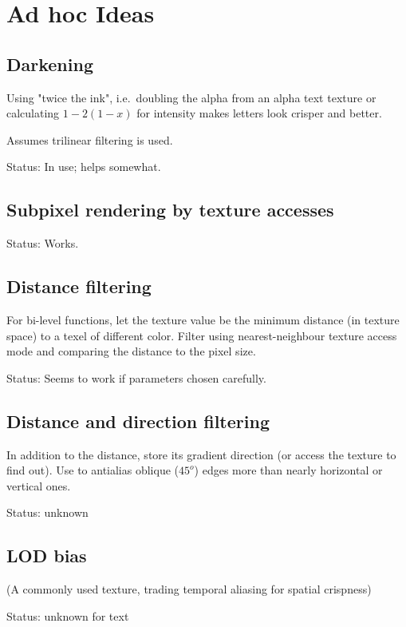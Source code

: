 \documentclass{article}
\begin{document}
\section{Ad hoc Ideas}


\subsection{Darkening}

Using "twice the ink", i.e.~doubling the alpha from an alpha text 
texture or calculating $1-2(1-x)$ for intensity makes
letters look crisper and better.

Assumes trilinear filtering is used.

Status: In use; helps somewhat.

\subsection{Subpixel rendering by texture accesses}

Status: Works.


\subsection{Distance filtering}

For bi-level functions, let the texture value be the minimum
distance (in texture space) to a texel of different color.
Filter using nearest-neighbour texture access mode and comparing
the distance to the pixel size.

Status: Seems to work if parameters chosen carefully.

\subsection{Distance and direction filtering}

In addition to the distance, store its gradient direction
(or access the texture to find out). Use to antialias
oblique ($45^o$) edges more than nearly horizontal or vertical ones.

Status: unknown

\subsection{LOD bias}

(A commonly used texture, trading temporal aliasing for spatial crispness)

Status: unknown for text
\end{document}

